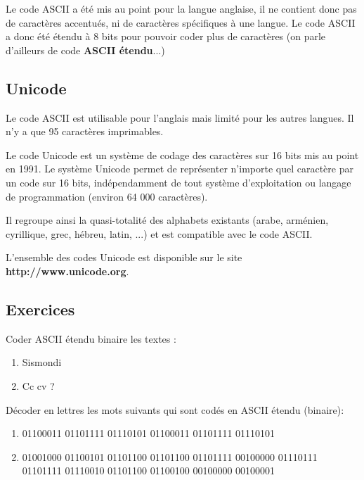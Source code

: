 \documentclass[11pt, a4paper]{book}
\begin{document}
Le code ASCII a été mis au point pour la langue anglaise, il ne contient donc pas de caractères accentués, ni de caractères spécifiques à une langue. Le code ASCII a donc été étendu à 8 bits pour pouvoir coder plus de caractères (on parle d'ailleurs de code \textbf{ASCII étendu}...)

\subsection{Unicode}

Le code ASCII est utilisable pour l'anglais mais limité pour les autres langues. Il n'y a que 95 caractères imprimables.

Le code Unicode est un système de codage des caractères sur 16 bits mis au point en 1991. Le système Unicode permet de représenter n'importe quel caractère par un code sur 16 bits, indépendamment de tout système d'exploitation ou langage de programmation (environ 64 000 caractères).

Il regroupe ainsi la quasi-totalité des alphabets existants (arabe, arménien, cyrillique, grec, hébreu, latin, ...) et est compatible avec le code ASCII.

L'ensemble des codes Unicode est disponible sur le site {\bf http://www.unicode.org}.


\subsection{Exercices}
\begin{exercice}
Coder ASCII étendu binaire les textes :
\begin{multicols}{2}
\begin{enumerate}
\item { Sismondi}
\item { Cc cv ?}
\end{enumerate}
\end{multicols}
\end{exercice}

\begin{exercice}
Décoder en lettres les mots suivants qui sont codés en ASCII étendu (binaire):
\begin{enumerate}
\item 01100011 01101111 01110101 01100011 01101111 01110101
\item 01001000 01100101 01101100 01101100 01101111 00100000 01110111 01101111 01110010 01101100 01100100 00100000 00100001
\end{enumerate}
\end{exercice}
\end{document}

